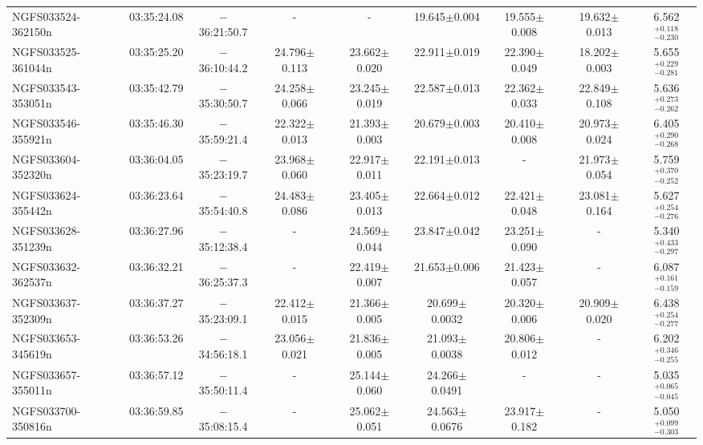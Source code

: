\begin{tabular}{lcccccccc}
  NGFS033524-362150n & 03:35:24.08 &$-$36:21:50.7   &	     -           &        -          & 19.645$\pm$0.004  &  19.555$\pm$0.008 &  19.632$\pm$0.013   &  6.562$_{-0.230} ^{+0.118}$ \\
  NGFS033525-361044n & 03:35:25.20 &$-$36:10:44.2   &	24.796$\pm$0.113 & 23.662$\pm$0.020  & 22.911$\pm$0.019  &  22.390$\pm$0.049 &  18.202$\pm$0.003   &  5.655$_{-0.281} ^{+0.229}$ \\
  NGFS033543-353051n & 03:35:42.79 &$-$35:30:50.7   &	24.258$\pm$0.066 & 23.245$\pm$0.019  & 22.587$\pm$0.013  &  22.362$\pm$0.033 &  22.849$\pm$0.108   &  5.636$_{-0.262} ^{+0.273}$ \\
  NGFS033546-355921n & 03:35:46.30 &$-$35:59:21.4   &	22.322$\pm$0.013 & 21.393$\pm$0.003  & 20.679$\pm$0.003  &  20.410$\pm$0.008 &  20.973$\pm$0.024   &  6.405$_{-0.268} ^{+0.290}$ \\
  NGFS033604-352320n & 03:36:04.05 &$-$35:23:19.7   &	23.968$\pm$0.060 & 22.917$\pm$0.011  & 22.191$\pm$0.013  &          -	     &  21.973$\pm$0.054   &  5.759$_{-0.252} ^{+0.370}$ \\
  NGFS033624-355442n & 03:36:23.64 &$-$35:54:40.8   &	24.483$\pm$0.086 & 23.405$\pm$0.013  & 22.664$\pm$0.012  &  22.421$\pm$0.048 &  23.081$\pm$0.164   &  5.627$_{-0.276} ^{+0.254}$ \\
  NGFS033628-351239n & 03:36:27.96 &$-$35:12:38.4   &	     -           & 24.569$\pm$0.044  & 23.847$\pm$0.042  &  23.251$\pm$0.090 &          -	   &  5.340$_{-0.297} ^{+0.433}$ \\
  NGFS033632-362537n & 03:36:32.21 &$-$36:25:37.3   &	     -           & 22.419$\pm$0.007  & 21.653$\pm$0.006  &  21.423$\pm$0.057 &          -	   &  6.087$_{-0.159} ^{+0.161}$ \\
  NGFS033637-352309n & 03:36:37.27 &$-$35:23:09.1   &	22.412$\pm$0.015 & 21.366$\pm$0.005  & 20.699$\pm$0.0032 &  20.320$\pm$0.006 &  20.909$\pm$0.020   &  6.438$_{-0.277} ^{+0.254}$ \\
  NGFS033653-345619n & 03:36:53.26 &$-$34:56:18.1   &	23.056$\pm$0.021 & 21.836$\pm$0.005  & 21.093$\pm$0.0038 &  20.806$\pm$0.012 &          -	   &  6.202$_{-0.255} ^{+0.346}$ \\
  NGFS033657-355011n & 03:36:57.12 &$-$35:50:11.4   &	     -           & 25.144$\pm$0.060  & 24.266$\pm$0.0491 &          -	     &          -	   &  5.035$_{-0.045} ^{+0.065}$ \\
  NGFS033700-350816n & 03:36:59.85 &$-$35:08:15.4   &	     -           & 25.062$\pm$0.051  & 24.563$\pm$0.0676 &  23.917$\pm$0.182 &          -	   &  5.050$_{-0.303} ^{+0.099}$ \\

\end{tabular}
